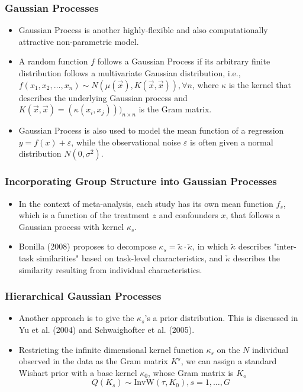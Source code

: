 \documentclass[xetex,mathserif,serif]{beamer}
\begin{document}
\begin{frame}
  \frametitle{Gaussian Processes}
  \begin{itemize}
  \item Gaussian Process is another highly-flexible and also computationally
    attractive non-parametric model.
  \item A random function $f$ follows a Gaussian Process if its arbitrary finite
    distribution follows a multivariate Gaussian distribution, i.e.,
    $f(x_1,x_2,\ldots,x_n)\sim N(\mu(\vec x), K(\vec x, \vec x)), \forall n$,
    where $\kappa$ is the kernel that describes the underlying Gaussian process
    and $K(\vec x, \vec x)=(\kappa(x_i, x_j)))_{n\times n}$ is the Gram matrix.
  \item Gaussian Process is also used to model the mean function of a regression
    $y=f(x)+\varepsilon$, while the observational noise $\varepsilon$ is often
    given a normal distribution $N(0, \sigma^2)$.
  \end{itemize}
\end{frame}

\begin{frame}
  \frametitle{Incorporating Group Structure into Gaussian Processes}
  \begin{itemize}
  \item In the context of meta-analysis, each study has its own mean function
    $f_s$, which is a function of the treatment $z$ and confounders $x$, that
    follows a Gaussian process with kernel $\kappa_s$.
    \pause
  \item Bonilla (2008) proposes to decompose $\kappa_s=\tilde\kappa\cdot\check\kappa$, in
    which $\tilde\kappa$ describes "inter-task similarities" based on task-level
    characteristics, and $\check\kappa$ describes the similarity resulting from
    individual characteristics.
  \end{itemize}
\end{frame}

\begin{frame}
  \frametitle{Hierarchical Gaussian Processes}
  \begin{itemize}
  \item Another approach is to give the $\kappa_s$'s a prior distribution. This
    is discussed in Yu et al. (2004) and Schwaighofter et al. (2005).
  \item Restricting the infinite dimensional kernel function $\kappa_s$ on the
    $N$ individual observed in the data as the Gram matrix $K^s$, we can assign a
    standard Wishart prior with a base kernel $\kappa_0$, whose Gram matrix is $K_o$
    \[Q(K_s)\sim \text{InvW}(\tau, K_0),  s=1,\ldots,G\]
  \end{itemize}
\end{frame}
\end{document}

